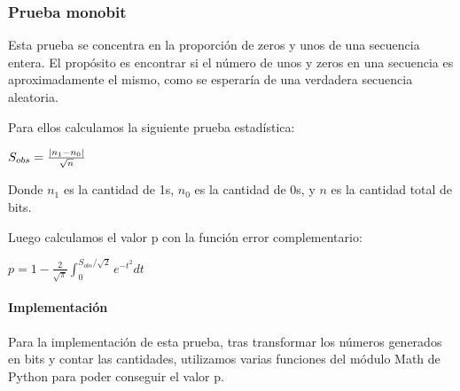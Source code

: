 \subsubsection{Prueba monobit}
Esta prueba se concentra en la proporción de zeros y unos de una secuencia entera. El propósito es encontrar si el número de unos y zeros en una secuencia es aproximadamente el mismo, como se esperaría de una verdadera secuencia aleatoria.

Para ellos calculamos la siguiente prueba estadística:

$S_{obs}={|n_1-n_0| \over \sqrt {n}}$

Donde $n_1$ es la cantidad de 1s, $n_0$ es la cantidad de 0s, y $n$ es la cantidad total de bits.

Luego calculamos el valor p con la función error complementario:

$p = 1-{{\frac {2}{\sqrt {\pi }}}\int _{0}^{S_{obs}/\sqrt{2}}e^{-t^{2}}dt}$

\paragraph{Implementación}
Para la implementación de esta prueba, tras transformar los números generados en bits y contar las cantidades,
utilizamos varias funciones del módulo Math de Python para poder conseguir el valor p.
